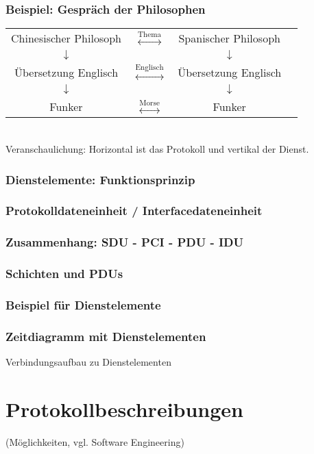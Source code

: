 \subsubsection*{Beispiel: Gespräch der Philosophen}
\begin{tabular}{c c c r}
Chinesischer Philosoph & $\overset{\text{Thema}}{\longleftrightarrow}$ & Spanischer Philosoph\\
$\downarrow$ &  &  $\downarrow$\\
Übersetzung Englisch & $\overset{\text{Englisch}}{\longleftrightarrow}$ & Übersetzung Englisch\\
$\downarrow$ & & $\downarrow$\\
Funker & $\overset{\text{Morse}}{\longleftrightarrow}$ & Funker
\end{tabular}\\
Veranschaulichung: Horizontal ist das Protokoll und vertikal der Dienst.
\subsubsection{Dienstelemente: Funktionsprinzip}
\subsubsection{Protokolldateneinheit / Interfacedateneinheit}
\subsubsection{Zusammenhang: SDU - PCI - PDU - IDU}
\subsubsection{Schichten und PDUs}
\subsubsection{Beispiel für Dienstelemente}
\subsubsection{Zeitdiagramm mit Dienstelementen}
Verbindungsaufbau zu Dienstelementen
\section{Protokollbeschreibungen}
(Möglichkeiten, vgl. Software Engineering)

